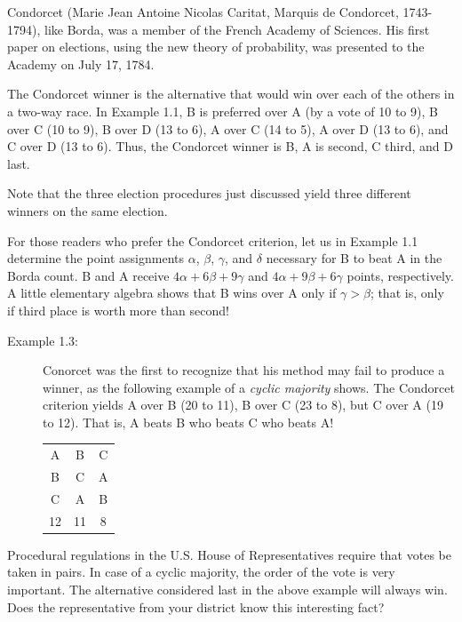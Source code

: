 \documentclass{article}
\begin{document}
Condorcet (Marie Jean Antoine Nicolas Caritat, Marquis de Condorcet, 1743-1794), like Borda, was a member of the French Academy of Sciences. His first paper on elections, using the new theory of probability, was presented to the Academy on July 17, 1784.

The Condorcet winner is the alternative that would win over each of the others in a two-way race. In Example 1.1, B is preferred over A (by a vote of 10 to 9), B over C (10 to 9), B over D (13 to 6), A over C (14 to 5), A over D (13 to 6), and C over D (13 to 6). Thus, the Condorcet winner is B, A is second, C third, and D last.

Note that the three election procedures just discussed yield three different winners on the same election.

For those readers who prefer the Condorcet criterion, let us in Example 1.1 determine the point assignments $\alpha$, $\beta$, $\gamma$, and $\delta$ necessary for B to beat A in the Borda count. B and A receive $4\alpha + 6\beta + 9\gamma$ and $4\alpha + 9\beta + 6\gamma$ points, respectively. A little elementary algebra shows that B wins over A only if $\gamma > \beta$; that is, only if third place is worth more than second!

\begin{description}

\item[Example 1.3:] Conorcet was the first to recognize that his method may fail to produce a winner, as the following example of a \emph{cyclic majority} shows. The Condorcet criterion yields A over B (20 to 11), B over C (23 to 8), but C over A (19 to 12). That is, A beats B who beats C who beats A!
  \begin{center}
  \begin{tabular}{c|c|c}
     A &  B &  C \\
     B &  C &  A \\
     C &  A &  B \\
    \hline
    12 & 11 &  8 \\
  \end{tabular}
  \end{center}

\end{description}

Procedural regulations in the U.S. House of Representatives require that votes be taken in pairs. In case of a cyclic majority, the order of the vote is very important. The alternative considered last in the above example will always win. Does the representative from your district know this interesting fact?
\end{document}

